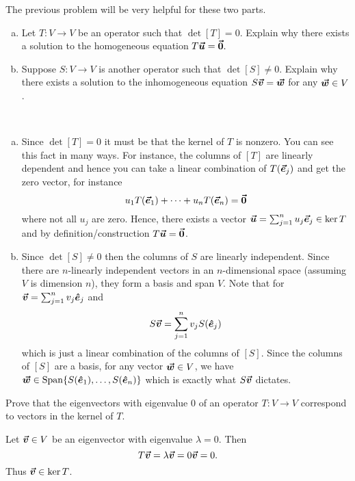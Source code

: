 \documentclass[12pt]{article} %
\newcommand{\ehat}{\boldsymbol{\hat{e}}}
\newcommand{\Span}{\operatorname{Span}}
\begin{document}
\newpage
\begin{problem}
The previous problem will be very helpful for these two parts.
\begin{enumerate}[(a)]
    \item Let $T\colon V\to V$ be an operator such that $\det [T]=0$. Explain why there exists a solution to the homogeneous equation $T\boldsymbol{\vec{u}} = \boldsymbol{\vec{0}}.$
    \item Suppose $S\colon V \to V$ is another operator such that $\det [S] \neq 0$. Explain why there exists a solution to the inhomogeneous equation $S\boldsymbol{\vec{v}} = \boldsymbol{\vec{w}}$ for any $\boldsymbol{\vec{w}} \in V$.
\end{enumerate}
\end{problem}
\begin{solution}~
\begin{enumerate}[(a)]
    \item Since $\det [T] = 0$ it must be that the kernel of $T$ is nonzero. You can see this fact in many ways. For instance, the columns of $[T]$ are linearly dependent and hence you can take a linear combination of $T(\boldsymbol{\vec{e}}_j)$ and get the zero vector, for instance
    \[
    u_1 T(\boldsymbol{\vec{e}}_1) + \cdots + u_n T(\boldsymbol{\vec{e}}_n) = \boldsymbol{\vec{0}}
    \]
    where not all $u_j$ are zero. Hence, there exists a vector $\boldsymbol{\vec{u}} = \sum_{j=1}^n u_j \boldsymbol{\vec{e}}_j \in \ker T$ and by definition/construction $T \boldsymbol{\vec{u}} = \boldsymbol{\vec{0}}$.
    \item Since $\det[S]\neq 0$ then the columns of $S$ are linearly independent. Since there are $n$-linearly independent vectors in an $n$-dimensional space (assuming $V$ is dimension $n$), they form a basis and span $V$. Note that for $\vecv=\sum_{j=1}^n v_j \ehat_j$ and
\[
S \vecv = \sum_{j=1}^n v_j S(\ehat_j)
\]
which is just a linear combination of the columns of $[S]$. Since the columns of $[S]$ are a basis, for any vector $\boldsymbol{\vec{w}} \in V$, we have $\vecw \in \Span \{S(\ehat_1),\dots, S(\ehat_n)\}$ which is exactly what $S\boldsymbol{\vec{v}}$ dictates.

\end{enumerate}
\end{solution}

\newpage
\begin{problem}
Prove that the eigenvectors with eigenvalue 0 of an operator $T\colon V \to V$ correspond to vectors in the kernel of $T$.
\end{problem}
\begin{solution}
Let $\boldsymbol{\vec{v}} \in V$ be an eigenvector with eigenvalue $\lambda = 0$. Then
\[
T \boldsymbol{\vec{v}} = \lambda \boldsymbol{\vec{v}} = 0 \boldsymbol{\vec{v}} = 0.
\]
Thus $\boldsymbol{\vec{v}} \in \ker T$.
\end{solution}
\end{document}
